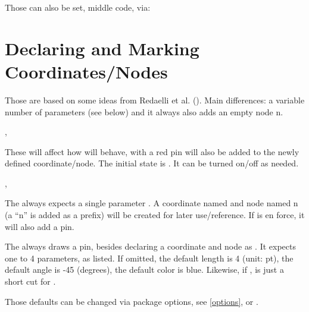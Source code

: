 \documentclass[10pt]{article}
\begin{document}
Those can also be set, middle code, via:
\begin{codedescribe}[code,new=2024/10/22]{\setpindefaults}
\begin{codesyntax}%
\end{codesyntax}
\end{codedescribe}

\section{Declaring and Marking Coordinates/Nodes}\label{coord}
Those are based on some ideas from Redaelli et al. (). Main differences: a variable number of parameters (see below) and it always also adds an empty node n.
\begin{codedescribe}{\showcoordstrue,\shoocoordsfalse}
\begin{codesyntax}%
\tsmacro{\showcoordstrue}{}
\tsmacro{\showcoordsfalse}{}
\end{codesyntax}
These will affect how \tsobj{\ncoord,\dotcoord,\odotcoord} will behave, with \tsobj{\showcoordstrue} a red pin will also be added to the newly defined coordinate/node. The initial state is \tsobj{\showcoordsfalse}. It can be turned on/off as needed.
\end{codedescribe}

\begin{codedescribe}{\ncoord,\pincoord}
\begin{codesyntax}%
\tsobj{\ncoord}\tsverb{(}\tsverb{)}
\tsobj{\pincoord}\tsverb{(}\tsverb{)}
\tsobj{\pincoord}\tsverb{(}\tsverb{)}
\tsobj{\pincoord}\tsverb{(}\tsverb{)}
\tsobj{\pincoord}\tsverb{(}\tsverb{)}
\end{codesyntax}
The \tsobj{\ncoord} always expects a single parameter . A coordinate named  and node named n (a ``n'' is added as a prefix) will be created for later use/reference. If \tsobj{\showcoordstrue} is en force, it will also add a pin.

The \tsobj{\pincoord} always draws a pin, besides declaring a coordinate and node as \tsobj{\ncoord}. It expects one to 4 parameters, as listed. If omitted, the default length is 4 (unit: pt), the default angle is -45 (degrees), the default color is blue.
Likewise, if \tsobj{\showcoordstrue},  is just a short cut for .
\end{codedescribe}
\begin{tsremark}
  Those defaults can be changed via package options, see \ref{options}, or \tsobj{\setpindefaults}.
\end{tsremark}
\end{document}
